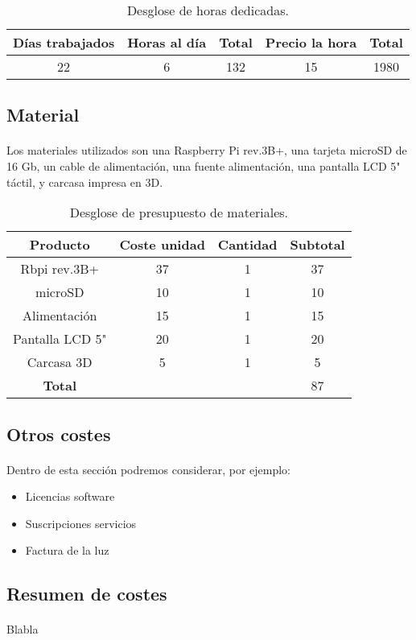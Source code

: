 \begin{table}[hbt]
	\label{t:recursoshumanos}
	\centering
	\begin{tabular}{|c|c|c|c|c|}
		\hline
        \textbf{Días trabajados} & \textbf{Horas al día} & \textbf{Total} & Precio la hora & \textbf{Total} \\
		\hline
		22 & 6 & 132 & 15 & 1980 \\
		\hline
	\end{tabular}
	\caption{Desglose de horas dedicadas.}
\end{table}

\subsection{Material}

\paragraph{}Los materiales utilizados son una Raspberry Pi rev.3B+, una tarjeta microSD
de 16 Gb, un cable de alimentación, una fuente alimentación, una pantalla LCD 5" táctil,
y carcasa impresa en 3D.


\begin{table}[hbt]
	\label{t:resumencostes}
	\centering
	\begin{tabular}{|c|c|c|c|}
		\hline
		\textbf{Producto} & \textbf{Coste unidad} & \textbf{Cantidad} & \textbf{Subtotal} \\
		\hline
		Rbpi rev.3B+ & 37 & 1 & 37 \\
		\hline
		microSD & 10 & 1 & 10 \\
		\hline
        Alimentación & 15 & 1 & 15 \\
		\hline
        Pantalla LCD 5" & 20 & 1 & 20 \\
		\hline
        Carcasa 3D & 5 & 1 & 5 \\
		\hline
		\textbf{Total} & & & 87 \\
		\hline
	\end{tabular}
    \caption{Desglose de presupuesto de materiales.}
\end{table}

\subsection{Otros costes}

\paragraph{}Dentro de esta sección podremos considerar, por ejemplo:

\begin{itemize}
    \item Licencias software
    \item Suscripciones servicios
    \item Factura de la luz
\end{itemize}

\subsection{Resumen de costes}

\paragraph{}Blabla
